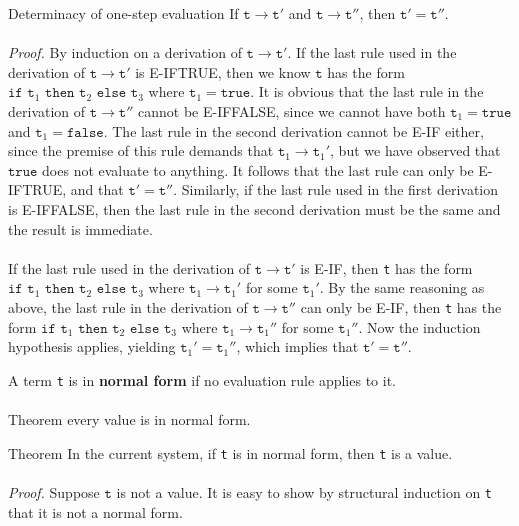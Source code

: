 \documentclass{article}
\begin{document}
\begin{redrules}\color{red}Determinacy of one-step evaluation \color{black} If \(\texttt{t}\to \texttt{t}'\) and \(\texttt{t}\to \texttt{t}''\), then \(\texttt{t}'=\texttt{t}''\).\\\\
\textit{Proof.} By induction on a derivation of \(\texttt{t}\to \texttt{t}'\). If the last rule used in the derivation of \(\texttt{t}\to \texttt{t}'\) is E-IFTRUE, then we know \(\texttt{t}\) has the form \(\texttt{if t}_{1}\texttt{ then t}_{2}\texttt{ else t}_{3}\) where \(\texttt{t}_{1}=\texttt{true}\). It is obvious that the last rule in the derivation of \(\texttt{t}\to \texttt{t}''\) 
cannot be E-IFFALSE, since we cannot have both \(\texttt{t}_{1}=\texttt{true}\) and \(\texttt{t}_{1}=\texttt{false}\). The last rule in the second derivation cannot be E-IF either, since the premise of this rule demands that \(\texttt{t}_{1}\to \texttt{t}_{1}'\), but we have observed that \(\texttt{true}\) does not evaluate to anything. It follows that the last rule can only be E-IFTRUE, and that \(\texttt{t}'=\texttt{t}''\).
Similarly, if the last rule used in the first derivation is E-IFFALSE, then the last rule in the second derivation must be the same and the result is immediate.\\\\
If the last rule used in the derivation of \(\texttt{t}\to \texttt{t}'\)  is E-IF, then \texttt{t} has the form \(\texttt{if t}_{1}\texttt{ then t}_{2}\texttt{ else t}_{3}\) where \(\texttt{t}_{1}\to \texttt{t}_{1}'\) for some \(\texttt{t}_{1}'\).
By the same reasoning as above, the last rule in the derivation of \(\texttt{t}\to \texttt{t}''\) can only be E-IF, then \texttt{t} has the form \(\texttt{if t}_{1}\texttt{ then t}_{2}\texttt{ else t}_{3}\) where \(\texttt{t}_{1}\to \texttt{t}_{1}''\) for some \(\texttt{t}_{1}''\).
Now the induction hypothesis applies, yielding \(\texttt{t}_{1}'=\texttt{t}_{1}''\), which implies that \(\texttt{t}'=\texttt{t}''\).
\end{redrules}
A term \texttt{t} is in \textbf{normal form} if no evaluation rule applies to it.\\\\
\color{red}Theorem \color{black} every value is in normal form.\\
\begin{redrules}
\color{red}Theorem \color{black} In the current system, if \texttt{t} is in normal form, then \texttt{t} is a value.\\\\
\textit{Proof.} Suppose \(\texttt{t}\) is not a value. It is easy to show by structural induction on \texttt{t} that it is not a normal form.
\end{redrules}
\end{document}
